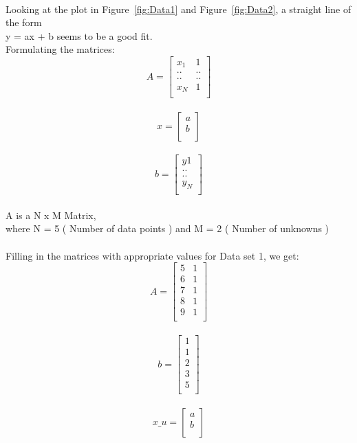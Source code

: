 \documentclass{article}
\begin{document}
\quad \\ %
Looking at the plot in Figure~\ref{fig:Data1} and Figure~\ref{fig:Data2}, a straight line of the form \\  y = ax + b seems to be a good fit.  \\
\newpage
\noindent Formulating the matrices: \\

\begin{equation}
A = 
	\begin{bmatrix}
		x_1 & 1 \\
		..   & ..  \\
		..   & ..  \\
		x_N & 1 \\
	\end{bmatrix}
\end{equation}
\\
\begin{equation}
	x = 
	\begin{bmatrix}
	a \\
	b \\
	\end{bmatrix}
\end{equation}
\\
\begin{equation}
	b = 
	\begin{bmatrix}
	y1 \\
	.. \\
	.. \\
	y_N\\
	\end{bmatrix}
\end{equation} \\
A is a N x M Matrix, \\
where N = 5 ( Number of data points ) and M = 2 ( Number of unknowns ) \\
\\
Filling in the matrices with appropriate values for Data set 1, we get: \\

\[
A=
  \begin{bmatrix}
	
     5 & 1 \\
     6 & 1 \\
     7 & 1 \\
     8 & 1 \\
     9 & 1 \\    
  \end{bmatrix}
\]
\\
\[
b=
  \begin{bmatrix}
	1 \\
     	1 \\
     	2 \\
     	3 \\
     	5 \\    
  \end{bmatrix}
\]
\\
\[
x\_u=
  \begin{bmatrix}
	a \\
	b \\    
  \end{bmatrix}
\]
\end{document}

